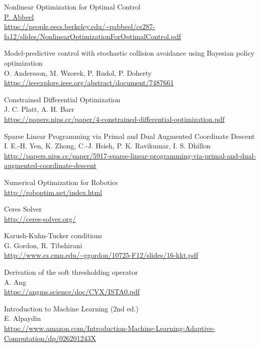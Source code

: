 \documentclass{article}
\begin{document}
\begin{thebibliography}{1}
        Nonlinear Optimization for Optimal Control
        \\
        \href{https://www2.eecs.berkeley.edu/Faculty/Homepages/abbeel.html}{P. Abbeel}
        \\
        \url{ https://people.eecs.berkeley.edu/~pabbeel/cs287-fa12/slides/NonlinearOptimizationForOptimalControl.pdf }

        Model-predictive control with stochastic collision avoidance using Bayesian policy optimization
        \\
        O. Andersson, M. Wzorek, P. Rudol, P. Doherty
        \\
        \url{ https://ieeexplore.ieee.org/abstract/document/7487661 }
    
    Constrained Differential Optimization
    \\
    J. C. Platt, A. H. Barr 
    \\
    \url{https://papers.nips.cc/paper/4-constrained-differential-optimization.pdf}

        Sparse Linear Programming via Primal and Dual Augmented Coordinate Descent
        \\
        I. E.-H. Yen, K. Zhong, C.-J. Hsieh, P. K. Ravikumar, I. S. Dhillon
        \\
        \url{ http://papers.nips.cc/paper/5917-sparse-linear-programming-via-primal-and-dual-augmented-coordinate-descent }

        Numerical Optimization for Robotics
        \\
        \url{ http://roboptim.net/index.html }
    
        Ceres Solver
        \\
        \url{ http://ceres-solver.org/ }

        Karush-Kuhn-Tucker conditions
        \\
        G. Gordon, R. Tibshirani
        \\
        \url{ http://www.cs.cmu.edu/~ggordon/10725-F12/slides/16-kkt.pdf }

        Derivation of the soft thresholding operator
        \\
        A. Ang
        \\
        \url{https://angms.science/doc/CVX/ISTA0.pdf}
    
        Introduction to Machine Learning (2nd ed.)
        \\
        E. Alpaydin
        \\
        \url{https://www.amazon.com/Introduction-Machine-Learning-Adaptive-Computation/dp/026201243X}


\end{thebibliography}
\end{document}
